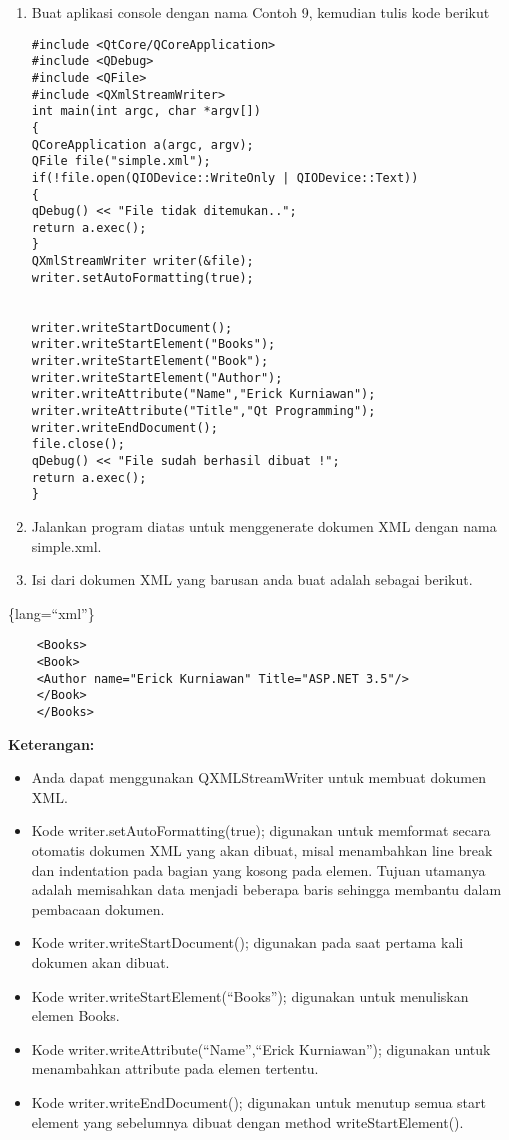 \begin{enumerate}
\def\labelenumi{\arabic{enumi}.}
\item
  Buat aplikasi console dengan nama Contoh 9, kemudian tulis kode
  berikut

\begin{verbatim}
#include <QtCore/QCoreApplication>
#include <QDebug>
#include <QFile>
#include <QXmlStreamWriter>
int main(int argc, char *argv[])
{
QCoreApplication a(argc, argv);
QFile file("simple.xml");
if(!file.open(QIODevice::WriteOnly | QIODevice::Text))
{
qDebug() << "File tidak ditemukan..";
return a.exec();
}
QXmlStreamWriter writer(&file);
writer.setAutoFormatting(true);


writer.writeStartDocument();
writer.writeStartElement("Books");
writer.writeStartElement("Book");
writer.writeStartElement("Author");
writer.writeAttribute("Name","Erick Kurniawan");
writer.writeAttribute("Title","Qt Programming");
writer.writeEndDocument();
file.close();
qDebug() << "File sudah berhasil dibuat !";
return a.exec();
}
\end{verbatim}
\item
  Jalankan program diatas untuk menggenerate dokumen XML dengan nama
  simple.xml.
\item
  Isi dari dokumen XML yang barusan anda buat adalah sebagai berikut.
\end{enumerate}

\{lang=``xml''\}

\begin{verbatim}
    <Books>
    <Book>
    <Author name="Erick Kurniawan" Title="ASP.NET 3.5"/>
    </Book>
    </Books>
\end{verbatim}

\textbf{Keterangan:}

\begin{itemize}
\tightlist
\item
  Anda dapat menggunakan QXMLStreamWriter untuk membuat dokumen XML.
\item
  Kode writer.setAutoFormatting(true); digunakan untuk memformat secara
  otomatis dokumen XML yang akan dibuat, misal menambahkan line break
  dan indentation pada bagian yang kosong pada elemen. Tujuan utamanya
  adalah memisahkan data menjadi beberapa baris sehingga membantu dalam
  pembacaan dokumen.
\item
  Kode writer.writeStartDocument(); digunakan pada saat pertama kali
  dokumen akan dibuat.
\item
  Kode writer.writeStartElement(``Books''); digunakan untuk menuliskan
  elemen Books.
\item
  Kode writer.writeAttribute(``Name'',``Erick Kurniawan''); digunakan
  untuk menambahkan attribute pada elemen tertentu.
\item
  Kode writer.writeEndDocument(); digunakan untuk menutup semua start
  element yang sebelumnya dibuat dengan method writeStartElement().
\end{itemize}

